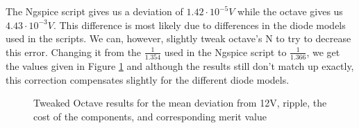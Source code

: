 \pagebreak
The Ngspice script gives us a deviation of $1.42\cdot 10^{-5}V$ while the octave gives us $4.43 \cdot 10^{-3}V$. This difference is most likely due to differences in the diode models used in the scripts. We can, however, slightly tweak octave's N to try to decrease this error. Changing it from the $\frac{1}{1.354}$ used in the Ngspice script to $\frac{1}{1.366}$, we get the values given in Figure \ref{fig:tweak_out} and although the results still don't match up exactly, this correction compensates slightly for the different diode models.

\begin{figure}[h]
	\centering
	\scalebox{1.2}{
		
	}
	\caption{Tweaked Octave results for the mean deviation from 12V, ripple, the cost of the components, and corresponding merit value}
	\label{fig:tweak_out}
\end{figure}
